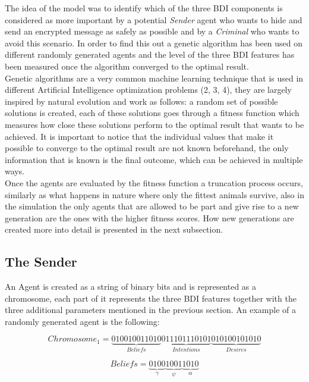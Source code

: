 \documentclass[a4paper]{article}
\begin{document}
The idea of the model was to identify which of the three BDI components is considered as more important by a potential \textit{Sender} agent who wants to hide and send an encrypted message as safely as possible and by a \textit{Criminal} who wants to avoid this scenario. In order to find this out a genetic algorithm has been used on different randomly generated agents and the level of the three BDI features has been measured once the algorithm converged to the optimal result. \\
Genetic algorithms are a very common machine learning technique that is used in different Artificial Intelligence optimization problems (2, 3, 4), they are largely inspired by natural evolution and work as follows: a random set of possible solutions is created, each of these solutions goes through a fitness function which measures how close these solutions perform to the optimal result that wants to be achieved. It is important to notice that the individual values that make it possible to converge to the optimal result are not known beforehand, the only information that is known is the final outcome, which can be achieved in multiple ways.\\
Once the agents are evaluated by the fitness function a truncation process occurs, similarly as what happens in nature where only the fittest animals survive, also in the simulation the only agents that are allowed to be part and give rise to a new generation are the ones with the higher fitness scores. How new generations are created more into detail is presented in the next subsection.


\subsection{The Sender}

An Agent is created as a string of binary bits and is represented as a chromosome, each part of it represents the three BDI features together with the three additional parameters mentioned in the previous section. An example of a randomly generated agent is the following:

\begin{equation}
	Chromosome_1 = \underbrace{010010011010}_{Beliefs}\underbrace{011101110101}_{Intentions}\underbrace{010100101010}_{Desires}
\end{equation}

\begin{equation}
	Beliefs = \underbrace{0100}_{\gamma} \underbrace{1001}_{\psi} \underbrace{1010}_{\alpha} 
\end{equation}  
\end{document}
